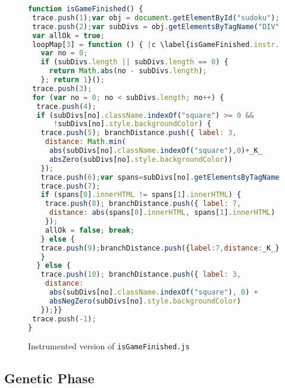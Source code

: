 \documentclass[sigconf,review]{acmart}
\begin{document}
\begin{figure}[t]
  \begin{lstlisting}[style=htmlcssjs,language=JavaScript]
function isGameFinished() {
 trace.push(1);var obj = document.getElementById("sudoku"); |c \label{isGameFinished.instr.trace} |c
 trace.push(2);var subDivs = obj.getElementsByTagName("DIV");
 var allOk = true;
 loopMap[3] = function () { |c \label{isGameFinished.instr.loopMap} |c
   var no = 0;
   if (subDivs.length || subDivs.length == 0) {
     return Math.abs(no - subDivs.length);
   }; return 1}();
 trace.push(3);
 for (var no = 0; no < subDivs.length; no++) {
  trace.push(4);
  if (subDivs[no].className.indexOf("square") >= 0 &&
      !subDivs[no].style.backgroundColor) {
   trace.push(5); branchDistance.push({ label: 3, 
    distance: Math.min(
     abs(subDivs[no].className.indexOf("square"),0)+_K_ 
     absZero(subDivs[no].style.backgroundColor))
   });
   trace.push(6);var spans=subDivs[no].getElementsByTagName("SPAN");
   trace.push(7);
   if (spans[0].innerHTML != spans[1].innerHTML) {
    trace.push(8); branchDistance.push({ label: 7, 
     distance: abs(spans[0].innerHTML, spans[1].innerHTML)
    });
    allOk = false; break;
   } else {
   trace.push(9);branchDistance.push({label:7,distance:_K_});
   }
  } else {
   trace.push(10); branchDistance.push({ label: 3,
    distance: 
     abs(subDivs[no].className.indexOf("square"), 0) + 
     absNegZero(subDivs[no].style.backgroundColor)
   });}}
 trace.push(-1);
}
\end{lstlisting}
  \caption{Instrumented version of \texttt{isGameFinished.js} }
  \label{code.isGameFinished.instr}
\end{figure}

\subsection{Genetic Phase}
\label{sub.sec.genetic.phase}
\end{document}
